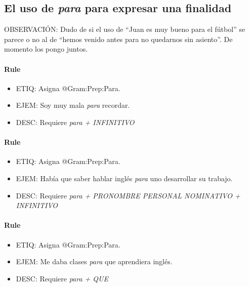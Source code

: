 \documentclass[11pt]{report}
\begin{document}
\subsection{El uso de \emph{para} para expresar una finalidad}
OBSERVACIÓN: Dudo de si el uso de ``Juan es muy bueno para el fútbol'' se parece o no al de ``hemos venido antes para no quedarnos sin asiento''. De momento los pongo juntos.

\paragraph*{Rule}
\begin{itemize}
\item ETIQ: Asigna @Gram:Prep:Para.
\item EJEM: Soy muy mala \emph{para} recordar.
\item DESC: Requiere \emph{para + INFINITIVO}
\end{itemize}

\paragraph*{Rule}
\begin{itemize}
\item ETIQ: Asigna @Gram:Prep:Para.
\item EJEM: Había que saber hablar inglés \emph{para} uno desarrollar su trabajo.
\item DESC: Requiere \emph{para + PRONOMBRE PERSONAL NOMINATIVO + INFINITIVO}
\end{itemize}

\paragraph*{Rule}
\begin{itemize}
\item ETIQ: Asigna @Gram:Prep:Para.
\item EJEM: Me daba clases \emph{para} que aprendiera inglés.
\item DESC: Requiere \emph{para + QUE}
\end{itemize}
\end{document}
